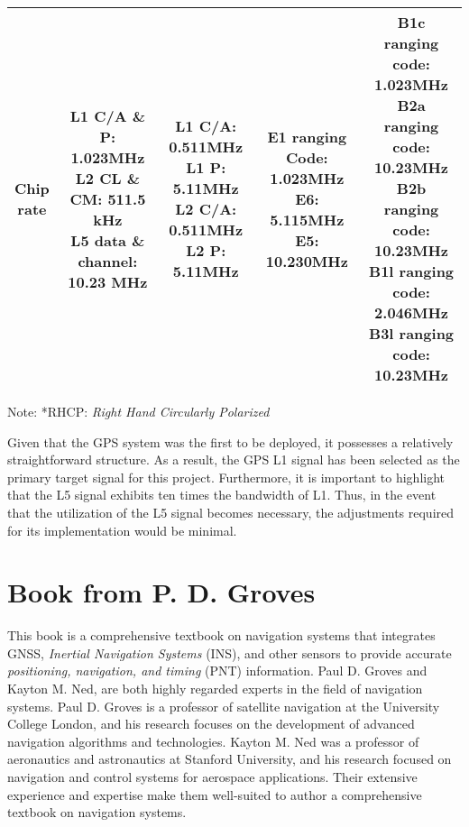 \begin{landscape}
\begin{center}
\begin{table}
\begin{tabular}{ccccc}
    \thead{Chip\\rate} & \thead{L1 C/A \& P: 1.023MHz\\L2 CL \& CM: 511.5 kHz\\L5 data \& channel: 10.23 MHz} & \thead{L1 C/A: 0.511MHz\\L1 P: 5.11MHz\\L2 C/A: 0.511MHz\\L2 P: 5.11MHz} & \thead{E1 ranging Code: 1.023MHz\\E6: 5.115MHz\\E5: 10.230MHz} & \thead{B1c ranging code: 1.023MHz\\B2a ranging code: 10.23MHz\\B2b ranging code: 10.23MHz\\B1l ranging code: 2.046MHz\\B3l ranging code: 10.23MHz}\\
    \bottomrule
    \end{tabular}
    \footnotesize Note: *RHCP: \textit{Right Hand Circularly Polarized}
\end{table}
\end{center}
\end{landscape}
Given that the GPS system was the first to be deployed, it possesses a relatively straightforward structure. As a result, the GPS L1 signal has been selected as the primary target signal for this project. Furthermore, it is important to highlight that the L5 signal exhibits ten times the bandwidth of L1. Thus, in the event that the utilization of the L5 signal becomes necessary, the adjustments required for its implementation would be minimal.

\section{Book from P. D. Groves\texorpdfstring{\cite{RN178}}{}}
This book is a comprehensive textbook on navigation systems that integrates GNSS, \textit{Inertial Navigation Systems} (INS), and other sensors to provide accurate \textit{positioning, navigation, and timing} (PNT) information. Paul D. Groves and Kayton M. Ned, are both highly regarded experts in the field of navigation systems. Paul D. Groves is a professor of satellite navigation at the University College London, and his research focuses on the development of advanced navigation algorithms and technologies. Kayton M. Ned was a professor of aeronautics and astronautics at Stanford University, and his research focused on navigation and control systems for aerospace applications. Their extensive experience and expertise make them well-suited to author a comprehensive textbook on navigation systems.

